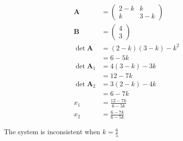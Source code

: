 \documentclass{article}
\begin{document}
\setcounter{subsubsection}{10}
\subsubsection{}

\begin{align*}
  \mathbf{A}        & = \begin{pmatrix}
                          2 - k & k     \\
                          k     & 3 - k
                        \end{pmatrix}           \\
  \mathbf{B}        & = \begin{pmatrix}
                          4 \\
                          3
                        \end{pmatrix}           \\
  \det \mathbf{A}   & = (2 - k) (3 - k) - k^2    \\
                    & = 6 - 5 k                  \\
  \det \mathbf{A}_1 & = 4 (3 - k) - 3 k          \\
                    & = 12 - 7 k                 \\
  \det \mathbf{A}_2 & = 3 (2 - k) - 4 k          \\
                    & = 6 - 7 k                  \\
  x_1               & = \frac{12 - 7 k}{6 - 5 k} \\
  x_2               & = \frac{6 - 7 k}{6 - 5 k}
\end{align*}

The system is inconsistent when $k = \frac{6}{5}$

\setcounter{subsubsection}{12}
\subsubsection{}
\end{document}
